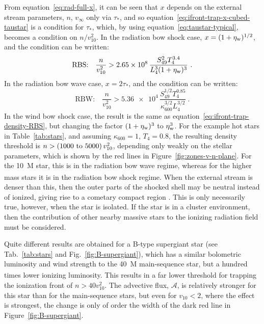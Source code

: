 From equation~\eqref{eq:rad-full-x}, it can be seen that \(x\) depends
on the external stream parameters, \(n\), \(v_\infty\) only via
\(\tau_*\), and so equation~\eqref{eq:ifront-trap-x-cubed-taustar} is a
condition for \(\tau_*\), which, by using
equation~\eqref{eq:taustar-typical}, becomes a condition on
\(n / v_{10}^2\).  In the radiation bow shock case,
\(x = (1 + \eta_{\text{w}})^{1/2}\), and the condition can be written:
\begin{equation}
  \label{eq:ifront-trap-density-RBS}
  \text{RBS:}\quad
  \frac{n}{v_{10}^2} > \num{2.65e8} \, \frac{S_{49}^2 T_4^{3.4}}{L_4^3 (1 + \eta_{\text{w}})^3} \ .
\end{equation}
In the radiation bow wave case, \(x = 2\tau_*\), and the condition can be
written:
\begin{equation}
  \label{eq:ifront-trap-taustar-RBW}
  \text{RBW:}\quad
  \frac{n}{v_{10}^2} > \num{5.36e4} \, \frac{S_{49}^{1/2} T_4^{0.85} }{\kappa_{600}^{3/2} L_4^{3/2}} \ . 
\end{equation}
In the wind bow shock case, the result is the same as
equation~\eqref{eq:ifront-trap-density-RBS}, but changing the factor
\((1 + \eta_{\text{w}})^3\) to \(\eta_{\text{w}}^3\).  For the example hot stars in
Table~\ref{tab:stars}, and assuming \(\kappa_{600} = 1\),
\(T_4 = 0.8\), the resulting density threshold is
\(n > (\text{\numrange{1000}{5000}})\, v_{10}^2\), depending only
weakly on the stellar parameters, which is shown by the red lines in
Figure~\ref{fig:zones-v-n-plane}.  For the \SI{10}{M_\odot} star, this is
in the radiation bow wave regime, whereas for the higher mass stars it
is in the radiation bow shock regime.  When the external stream is
denser than this, then the outer parts of the shocked shell may be
neutral instead of ionized, giving rise to a cometary compact \hii{}
region \citep{Mac-Low:1991a, Arthur:2006a}.  This is only necessarily
true, however, when the star is isolated.  If the star is in a cluster
environment, then the contribution of other nearby massive stars to
the ionizing radiation field must be considered.

Quite different results are obtained for a B-type supergiant star (see
Tab.~\ref{tab:stars} and Fig.~\ref{fig:B-supergiant}), which has a
similar bolometric luminosity and wind strength to the \SI{40}{M_\odot}
main-sequence star, but a hundred times lower ionizing luminosity.
This results in a far lower threshold for trapping the ionization
front of \(n > 40 v_{10}^2\).  The advective flux, \(\mathcal{A}\), is
relatively stronger for this star than for the main-sequence stars, but
even for \(v_{10} < 2\), where the effect is strongest, the change is
only of order the width of the dark red line in
Figure~\ref{fig:B-supergiant}.


